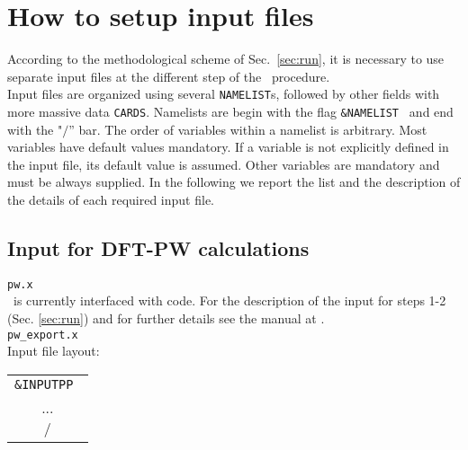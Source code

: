 
\thispagestyle{empty}
\section{How to setup input files}\label{sec:input}

\noindent According to the methodological scheme of Sec.~\ref{sec:run}, 
it is necessary to use separate input files at
the different step of the \WANT\ procedure.\\

\noindent Input files are organized using several {\tt NAMELIST}s,
followed by other fields with more massive data {\tt CARDS}. Namelists are
begin with the flag {\tt \&NAMELIST } and end with the
"$/$'' bar. The order of variables within a namelist is
arbitrary. Most variables have default values mandatory. 
If a variable is not explicitly defined in the input file, 
its default value is assumed. Other variables are mandatory and must be
always supplied.
In the following we report the list and the description
of the details of each required input file.

\subsection{Input for DFT-PW calculations}
 {\tt pw.x}
\\
\noindent \WANT\ is currently interfaced with \PWSCF code. For the
description of the input for steps 1-2 (Sec. \ref{sec:run})
and for further details see the \PWSCF manual at \PWSCFURL .\\

  {\tt pw\_export.x}
\\
\noindent Input file layout: \\

%
%
\begin{tabular}{c}
  {\tt \&INPUTPP } \\
    ... \\
  $/$
\end{tabular}
%
%
\\

